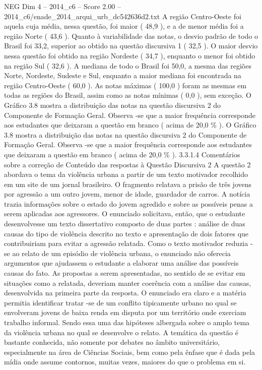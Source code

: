 \begin{textsample}{NEG Dim 4 – 2014\_c6 – Score 2.00 – 2014\_c6/enade\_2014\_arqui\_urb\_dc542636d2.txt}
A região Centro-Oeste foi aquela cuja média, nessa questão, foi maior ( 48,9 ), e a de menor média foi a região Norte ( 43,6 ).
Quanto à variabilidade das notas, o desvio padrão de todo o Brasil foi 33,2, superior ao obtido na questão discursiva 1 ( 32,5 ).
O maior desvio nessa questão foi obtido na região Nordeste ( 34,7 ), enquanto o menor foi obtido na região Sul ( 32,6 ).
A mediana de todo o Brasil foi 50,0, a mesma das regiões Norte, Nordeste, Sudeste e Sul, enquanto a maior mediana foi encontrada na região Centro-Oeste ( 60,0 ).
As notas máximas ( 100,0 ) foram as mesmas em todas as regiões do Brasil, assim como as notas mínimas ( 0,0 ), sem exceção.
O Gráfico 3.8 mostra a distribuição das notas na questão discursiva 2 do Componente de Formação Geral.
Observa -se que a maior frequência corresponde aos estudantes que deixaram a questão em branco ( acima de 20,0 \% ).
O Gráfico 3.8 mostra a distribuição das notas na questão discursiva 2 do Componente de Formação Geral.
Observa -se que a maior frequência corresponde aos estudantes que deixaram a questão em branco ( acima de 20,0 \% ). 3.3.1.4 Comentários sobre a correção de Conteúdo das respostas à Questão Discursiva 2 A questão 2 abordava o tema da violência urbana a partir de um texto motivador recolhido em um site de um jornal brasileiro.
O fragmento relatava a prisão de três jovens por agressão a um outro jovem, menor de idade, guardador de carros.
A notícia trazia informações sobre o estado do jovem agredido e sobre as possíveis penas a serem aplicadas aos agressores.
O enunciado solicitava, então, que o estudante desenvolvesse um texto dissertativo composto de duas partes : análise de duas causas do tipo de violência descrito no texto e apresentação de dois fatores que contribuiriam para evitar a agressão relatada.
Como o texto motivador reduzia -se ao relato de um episódio de violência urbana, o enunciado não oferecia argumentos que ajudassem o estudante a elaborar uma análise das possíveis causas do fato.
As propostas a serem apresentadas, no sentido de se evitar em situações como a relatada, deveriam manter coerência com a análise das causas, desenvolvida na primeira parte da resposta.
O enunciado era claro e a matéria permitia identificar tratar -se de um conflito tipicamente urbano no qual se envolveram jovens de baixa renda em disputa por um território onde exerciam trabalho informal.
Sendo essa uma das hipóteses albergada sobre o amplo tema da violência urbana no qual se desenvolve o relato.
A temática da questão é bastante conhecida, não somente por debates no âmbito universitário, especialmente na área de Ciências Sociais, bem como pela ênfase que é dada pela mídia onde assume contornos, muitas vezes, maiores do que o problema em si.

\end{textsample}
